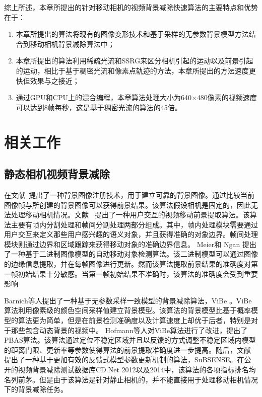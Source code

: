 综上所述，本章所提出的针对移动相机的视频背景减除快速算法的主要特点和优势在于：
\begin{enumerate}
\item 本章所提出的算法将现有的图像变形技术和基于采样的无参数背景模型方法结合到移动相机背景减除算法中；
\item 本章所提出的算法利用稀疏光流和SSRG来区分相机引起的运动以及前景引起的运动，相比于基于稠密光流和像素点轨迹的方法，本章所提出的方法速度更快但效果与之接近；
\item 通过GPU和CPU上的混合编程，本章算法处理大小为640$\times$480像素的视频速度可以达到8帧每秒，这是基于稠密光流的算法\cite{gbsuperpixel}的45倍。
\end{enumerate}


 \section{相关工作}
 \label{ch4:sec:relatedWorks}

 \subsection{静态相机视频背景减除}
 \label{ch4:sec:sub:scbs}

 在文献~提出了一种背景图像注册技术，用于建立可靠的背景图像。通过比较当前图像帧与所创建的背景图像可以获得前景结果。该算法假设相机是固定的，因此无法处理移动相机情况。文献 ~提出了一种用户交互的视频移动前景提取算法。该算法主要有帧内分割处理和帧间分割处理两部分组成。其中，帧内处理模块需要通过用户交互来定义那些用户感兴趣的语义对象，并且获得准确的对象边界。帧间处理模块则通过边界和区域跟踪来获得移动对象的准确边界信息。 Meier和 Ngan\cite{Meier1998Automatic} 提出了一种基于二进制图像模型的自动移动对象检测算法。该二进制模型可以通过图像的边缘信息提取，并在每帧图像进行更新。然而该算法提取前景结果的准确度对第一帧初始结果十分敏感。当第一帧初始结果不准确时，该算法的准确度会受到重要影响 \par
Barnich等人提出了一种基于无参数采样一致模型的背景减除算法，ViBe \cite{Barnich2011ViBe}。ViBe算法利用像素级的颜色空间采样值建立背景模型。该算法的背景模型比基于概率模型的算法\cite{GMMPAMI}更为简单，但是在前景检测准确度以及计算速度上却优于后者，特别是对于那些包含动态背景的视频中。 Hofmann等人对ViBe算法进行了改进，提出了PBAS算法。该算法通过定位不稳定区域并且以反馈的方式调整不稳定区域内模型的距离门限、更新率等参数使得算法的前景提取准确度进一步提高。随后，文献 提出了一种基于更加有效的反馈式模型参数更新机制的算法，SuBSENSE。在公开的视频背景减除测试数据库CD.Net 2012以及2014中，该算法的各项指标排名均名列前茅。但是由于该算法是针对静止相机的，并不能直接用于处理移动相机情况下的背景减除任务。\par

